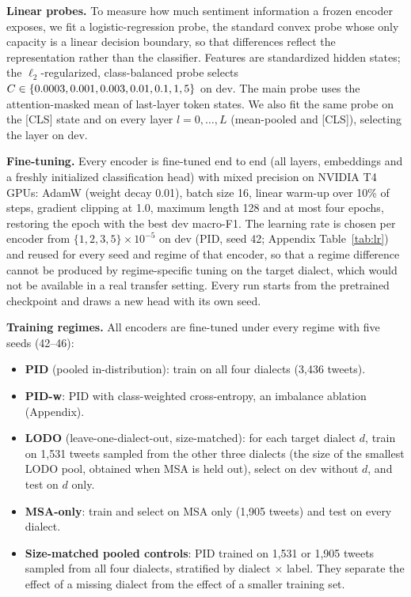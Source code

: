 \documentclass[11pt]{article}
\begin{document}
\textbf{Linear probes.} To measure how much sentiment information a frozen encoder exposes, we fit a logistic-regression probe, the standard convex probe whose only capacity is a linear decision boundary, so that differences reflect the representation rather than the classifier. Features are standardized hidden states; the $\ell_2$-regularized, class-balanced probe selects $C\in\{0.0003, 0.001, 0.003, 0.01, 0.1, 1, 5\}$ on dev. The main probe uses the attention-masked mean of last-layer token states. We also fit the same probe on the [CLS] state and on every layer $l=0,\dots,L$ (mean-pooled and [CLS]), selecting the layer on dev.

\textbf{Fine-tuning.} Every encoder is fine-tuned end to end (all layers, embeddings and a freshly initialized classification head) with mixed precision on NVIDIA T4 GPUs: AdamW (weight decay 0.01), batch size 16, linear warm-up over 10\% of steps, gradient clipping at 1.0, maximum length 128 and at most four epochs, restoring the epoch with the best dev macro-F1. The learning rate is chosen per encoder from $\{1,2,3,5\}\times10^{-5}$ on dev (PID, seed 42; Appendix Table~\ref{tab:lr}) and reused for every seed and regime of that encoder, so that a regime difference cannot be produced by regime-specific tuning on the target dialect, which would not be available in a real transfer setting. Every run starts from the pretrained checkpoint and draws a new head with its own seed.

\textbf{Training regimes.} All encoders are fine-tuned under every regime with five seeds (42--46):
\begin{itemize}
\item \textbf{PID} (pooled in-distribution): train on all four dialects (3,436 tweets).
\item \textbf{PID-w}: PID with class-weighted cross-entropy, an imbalance ablation (Appendix).
\item \textbf{LODO} (leave-one-dialect-out, size-matched): for each target dialect $d$, train on 1,531 tweets sampled from the other three dialects (the size of the smallest LODO pool, obtained when MSA is held out), select on dev without $d$, and test on $d$ only.
\item \textbf{MSA-only}: train and select on MSA only (1,905 tweets) and test on every dialect.
\item \textbf{Size-matched pooled controls}: PID trained on 1,531 or 1,905 tweets sampled from all four dialects, stratified by dialect $\times$ label. They separate the effect of a missing dialect from the effect of a smaller training set.
\end{itemize}
\end{document}
